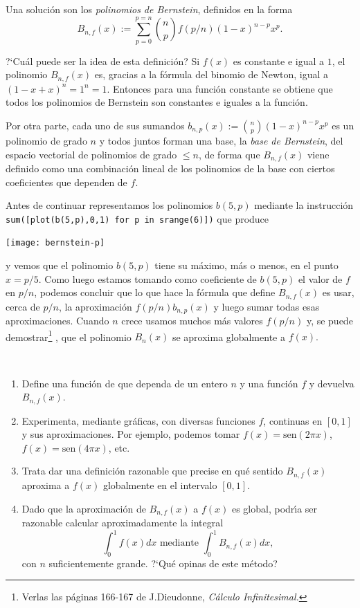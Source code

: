 Una soluci\'on son los {\itshape polinomios de Bernstein}, definidos en la
forma 
\[B_{n,f}(x):=\sum_{p=0}^{p=n} \binom{n}{p}f(p/n)(1-x)^{n-p}x^p.\]

?`Cu\'al puede ser la idea de esta definici\'on? Si $f(x)$ es constante e igual
a $1$, el polinomio $B_{n,f}(x)$ es, gracias a la f\'ormula del binomio de
Newton, igual a $(1-x+x)^n=1^n=1$. Entonces para una funci\'on constante se
obtiene que todos los polinomios de Bernstein son constantes e iguales a la
funci\'on. 

Por otra parte, cada uno de sus sumandos
$b_{n,p}(x):=\binom{n}{p}(1-x)^{n-p}x^p$ es un polinomio de grado $n$ y todos
juntos forman una base, la {\itshape base de Bernstein},   del espacio vectorial
de polinomios de grado $\le n$, de forma que $B_{n,f}(x)$ viene definido como
una combinaci\'on lineal de los polinomios de la base con ciertos coeficientes
que dependen de $f$. 

Antes de continuar representamos los polinomios $b(5,p)$ mediante la
instrucci\'on \lstinline|sum([plot(b(5,p),0,1) for p in srange(6)])| que produce
\begin{center}
 \texttt{[image: bernstein-p]}
\end{center}
\noindent y vemos que el polinomio $b(5,p)$ tiene su m\'aximo, m\'as o menos, 
en el punto $x=p/5$. Como luego estamos tomando como coeficiente de $b(5,p)$ el
valor de $f$ en $p/n$, podemos concluir que lo que hace la f\'ormula que define
$B_{n,f}(x)$ es usar, cerca de $p/n$, la aproximaci\'on  $f(p/n)b_{n,p}(x)$ y
luego sumar todas esas aproximaciones. Cuando $n$ crece usamos muchos m\'as
valores $f(p/n)$ y, se puede demostrar\footnote{Verlas las p\'aginas 166-167 de
J.Dieudonne, {\itshape C\'alculo
Infinitesimal.}}  , que el polinomio $B_n(x)$
se aproxima
globalmente a $f(x).$

\

\begin{ejer}


\begin{enumerate}
  \item Define una funci\'on de {\sage} que dependa de un entero $n$ y una
funci\'on $f$ y devuelva $B_{n,f}(x).$ 

\item Experimenta, mediante gr\'aficas,  con diversas funciones $f$, continuas
en $[0,1]$ y sus aproximaciones. Por ejemplo, podemos tomar
$f(x)=\mathrm{sen}(2\pi x)$,
$f(x)=\mathrm{sen}(4\pi x)$, etc.

\item Trata dar una definici\'on razonable que precise en qu\'e sentido
$B_{n,f}(x)$ aproxima a $f(x)$ globalmente en el intervalo $[0,1].$

\item Dado que la aproximaci\'on de $B_{n,f}(x)$ a $f(x)$ es global, podr\'{\i}a
ser razonable calcular aproximadamente la integral 
\[\int_0^1 f(x)dx \text{ mediante }  \int_0^1 B_{n,f}(x)dx, \]
con $n$ suficientemente grande. ?`Qu\'e opinas de este m\'etodo?
\end{enumerate}
\end{ejer}

